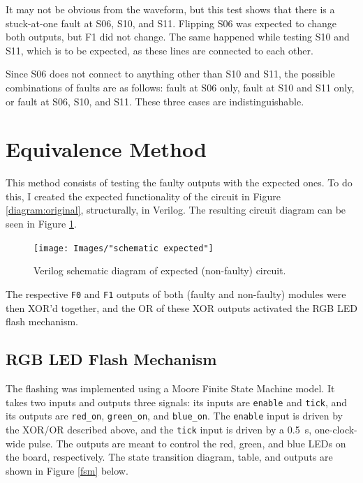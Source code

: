 \documentclass{article}
\renewcommand{\c}[1]{\texttt{#1}}
\begin{document}
It may not be obvious from the waveform, but this test
shows that there is a stuck-at-one fault at S06, S10, and
S11. Flipping S06 was expected to change both outputs,
but F1 did not change. The same happened while testing S10
and S11, which is to be expected, as these lines are connected
to each other.

Since S06 does not connect to anything other than S10 and S11,
the possible combinations of faults are as follows: fault
at S06 only, fault at S10 and S11 only, or fault at S06, S10,
and S11. These three cases are indistinguishable.

\section{Equivalence Method} This method consists of testing
the faulty outputs with the expected ones. To do this,
I created the expected functionality of the circuit in
Figure \ref{diagram:original}, structurally, in
Verilog. The resulting circuit diagram can be seen in
Figure \ref{diagram:expected}.

\begin{figure}[H]
    \centering
    \texttt{[image: Images/"schematic expected"]}
    \caption{Verilog schematic diagram of expected (non-faulty) circuit.}
    \label{diagram:expected}
\end{figure}

The respective \c{F0} and \c{F1} outputs of both (faulty and
non-faulty) modules were then XOR'd together, and the OR
of these XOR outputs activated the RGB LED flash mechanism.

\subsection{RGB LED Flash Mechanism} The flashing was
implemented using a Moore Finite State Machine model.
It takes two inputs and outputs three signals: its inputs
are \c{enable} and \c{tick}, and its outputs are \c{red\_on},
\c{green\_on}, and \c{blue\_on}. The \c{enable} input is
driven by the XOR/OR described above, and the \c{tick}
input is driven by a \SI{0.5}{s}, one-clock-wide pulse.
The outputs are meant to control the red, green, and blue
LEDs on the board, respectively. The
state transition diagram, table, and outputs are shown
in Figure \ref{fsm} below.
\end{document}
